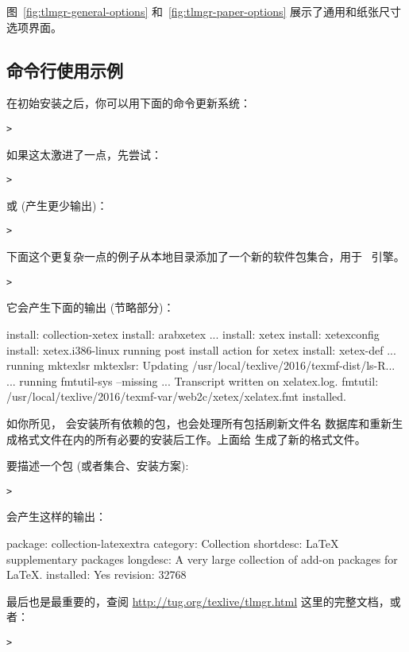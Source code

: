 \documentclass{article}
\begin{document}
图~\ref{fig:tlmgr-general-options} 和~\ref{fig:tlmgr-paper-options}
展示了通用和纸张尺寸选项界面。

\subsection{ 命令行使用示例}

在初始安装之后，你可以用下面的命令更新系统：
\begin{alltt}
> 
\end{alltt}
如果这太激进了一点，先尝试：
\begin{alltt}
> 
\end{alltt}
或 (产生更少输出)：
\begin{alltt}
> 
\end{alltt}

下面这个更复杂一点的例子从本地目录添加了一个新的软件包集合，用于 \XeTeX\ 引擎。

\begin{alltt}
> 
\end{alltt}
它会产生下面的输出 (节略部分)：
\begin{fverbatim}
install: collection-xetex
install: arabxetex
...
install: xetex
install: xetexconfig
install: xetex.i386-linux
running post install action for xetex
install: xetex-def
...
running mktexlsr
mktexlsr: Updating /usr/local/texlive/2016/texmf-dist/ls-R...
...
running fmtutil-sys --missing
...
Transcript written on xelatex.log.
fmtutil: /usr/local/texlive/2016/texmf-var/web2c/xetex/xelatex.fmt installed.
\end{fverbatim}

如你所见， 会安装所有依赖的包，也会处理所有包括刷新文件名
数据库和重新生成格式文件在内的所有必要的安装后工作。上面给 \XeTeX{}
生成了新的格式文件。

要描述一个包 (或者集合、安装方案):
\begin{alltt}
> 
\end{alltt}
会产生这样的输出：
\begin{fverbatim}
package:    collection-latexextra
category:   Collection
shortdesc:  LaTeX supplementary packages
longdesc:   A very large collection of add-on packages for LaTeX.
installed:  Yes
revision:   32768
\end{fverbatim}

最后也是最重要的，查阅 \url{http://tug.org/texlive/tlmgr.html}
这里的完整文档，或者：
\begin{alltt}
> 
\end{alltt}
\end{document}
